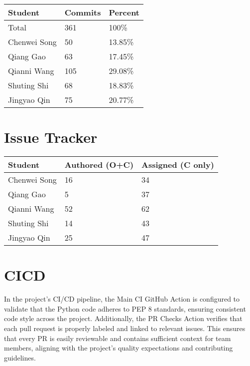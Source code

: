 \documentclass{article}
\begin{document}
\begin{table}[H]
\centering
\begin{tabular}{lll}
\toprule
\textbf{Student} & \textbf{Commits} & \textbf{Percent}\\
\midrule
Total & 361 & 100\% \\
Chenwei Song & 50 & 13.85\%\\
Qiang Gao & 63 & 17.45\%\\
Qianni Wang & 105 & 29.08\%\\
Shuting Shi & 68 & 18.83\%\\
Jingyao Qin & 75 & 20.77\%\\
\bottomrule
\end{tabular}
\end{table}

\section{Issue Tracker}


\begin{table}[H]
\centering
\begin{tabular}{lll}
\toprule
\textbf{Student} & \textbf{Authored (O+C)} & \textbf{Assigned (C only)}\\
\midrule
Chenwei Song & 16 & 34 \\
Qiang Gao & 5 & 37 \\
Qianni Wang & 52 & 62 \\
Shuting Shi & 14 & 43 \\
Jingyao Qin & 25 & 47 \\
\bottomrule
\end{tabular}
\end{table}


\section{CICD}

In the project's CI/CD pipeline, the Main CI GitHub Action is configured to validate that the Python code adheres to PEP 8 standards, ensuring consistent code style across the project. Additionally, the PR Checks Action verifies that each pull request is properly labeled and linked to relevant issues. This ensures that every PR is easily reviewable and contains sufficient context for team members, aligning with the project's quality expectations and contributing guidelines.
\end{document}
